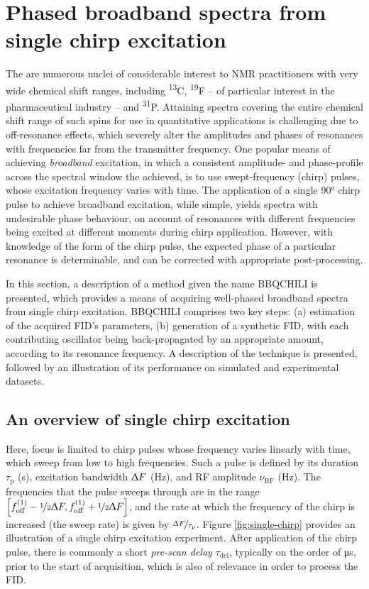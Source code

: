 \section{Phased broadband spectra from single chirp excitation}
\label{sec:bbqchili}

The are numerous nuclei of considerable interest to \ac{NMR} practitioners with
very wide chemical shift ranges, including \textsuperscript{13}C,
\textsuperscript{19}F -- of particular interest in the
pharmaceutical industry -- and \textsuperscript{31}P. Attaining spectra
covering the entire
chemical shift range of such spins for use in quantitative applications is
challenging due to off-resonance effects, which severely alter the amplitudes
and phases of resonances with frequencies far from the transmitter
frequency\cite[Section 3.4.1]{Cavanagh2007}. One popular means of achieving
\emph{broadband} excitation, in which a consistent amplitude- and phase-profile
across the spectral window the achieved, is to use swept-frequency (chirp)
pulses, whose excitation frequency varies with
time\cite{Bohlen1989,Bohlen1993}.
The application of a single \ang{90} chirp pulse to achieve broadband
excitation, while simple, yields spectra with undesirable phase behaviour, on
account of resonances with different frequencies being excited at different
moments during chirp application. However, with knowledge of the form of the
chirp pulse, the expected phase of a particular resonance is determinable, and
can be corrected with appropriate post-processing.

In this section, a description of a method given the name \ac{BBQCHILI} is
presented, which provides a means of acquiring well-phased broadband spectra
from single chirp excitation. \ac{BBQCHILI} comprises two key steps: (a)
estimation of the acquired \ac{FID}'s parameters, (b) generation of a synthetic
\ac{FID}, with each contributing oscillator being back-propagated by an
appropriate amount, according to its resonance frequency. A description of the
technique is presented, followed by an illustration of its performance on
simulated and experimental datasets.

\subsection{An overview of single chirp excitation}
Here, focus is limited to chirp pulses whose frequency varies linearly with
time, which sweep from low to high frequencies. Such a pulse is defined by its
duration $\tau_{\text{p}}$ (\unit{\second}),
excitation bandwidth $\Updelta F$ (\unit{\hertz}),
and \ac{RF} amplitude $\nu_{\text{RF}}$ (\unit{\hertz}).
The frequencies that the pulse sweeps through are in the range $\left[f_{\mathrm{off}}^{(1)} -
\nicefrac{1}{2} \Updelta F, f_{\mathrm{off}}^{(1)} + \nicefrac{1}{2} \Updelta F\right]$, and
the rate at which the frequency of the chirp is increased (the sweep rate) is
given by $\nicefrac{\Updelta F}{\tau_{\text{p}}}$.
Figure \ref{fig:single-chirp} provides an illustration of a single chirp
excitation experiment. After application of the chirp pulse, there is commonly
a short \emph{pre-scan delay} $\tau_{\text{del}}$, typically on the order of
\unit{\micro\second}, prior to the start of acquisition, which is also of
relevance in order to process the \ac{FID}.

